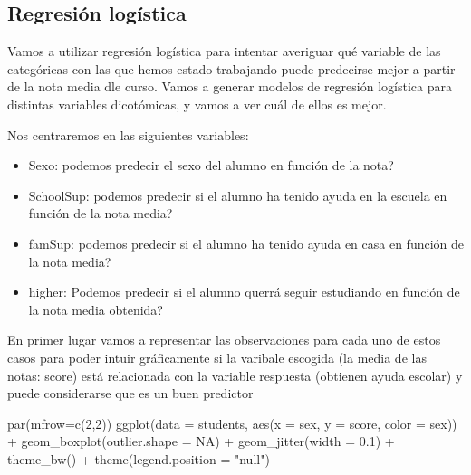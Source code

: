 \documentclass[]{article}
\newenvironment{Shaded}{\begin{snugshade}}{\end{snugshade}}
\newcommand{\DataTypeTok}[1]{\textcolor[rgb]{0.87,0.87,0.75}{#1}}
\newcommand{\DecValTok}[1]{\textcolor[rgb]{0.86,0.86,0.80}{#1}}
\newcommand{\FloatTok}[1]{\textcolor[rgb]{0.75,0.75,0.82}{#1}}
\newcommand{\KeywordTok}[1]{\textcolor[rgb]{0.94,0.87,0.69}{#1}}
\newcommand{\NormalTok}[1]{\textcolor[rgb]{0.80,0.80,0.80}{#1}}
\newcommand{\OperatorTok}[1]{\textcolor[rgb]{0.94,0.94,0.82}{#1}}
\newcommand{\OtherTok}[1]{\textcolor[rgb]{0.94,0.94,0.56}{#1}}
\newcommand{\StringTok}[1]{\textcolor[rgb]{0.80,0.58,0.58}{#1}}
\providecommand{\tightlist}{%
  \setlength{\itemsep}{0pt}\setlength{\parskip}{0pt}}
\begin{document}
\hypertarget{regresion-logistica}{%
\subsection{Regresión logística}\label{regresion-logistica}}

Vamos a utilizar regresión logística para intentar averiguar qué
variable de las categóricas con las que hemos estado trabajando puede
predecirse mejor a partir de la nota media dle curso. Vamos a generar
modelos de regresión logística para distintas variables dicotómicas, y
vamos a ver cuál de ellos es mejor.

Nos centraremos en las siguientes variables:

\begin{itemize}
\tightlist
\item
  Sexo: podemos predecir el sexo del alumno en función de la nota?
\item
  SchoolSup: podemos predecir si el alumno ha tenido ayuda en la escuela
  en función de la nota media?
\item
  famSup: podemos predecir si el alumno ha tenido ayuda en casa en
  función de la nota media?
\item
  higher: Podemos predecir si el alumno querrá seguir estudiando en
  función de la nota media obtenida?
\end{itemize}

En primer lugar vamos a representar las observaciones para cada uno de
estos casos para poder intuir gráficamente si la varibale escogida (la
media de las notas: score) está relacionada con la variable respuesta
(obtienen ayuda escolar) y puede considerarse que es un buen predictor

\begin{Shaded}
\begin{Highlighting}[]
\KeywordTok{par}\NormalTok{(}\DataTypeTok{mfrow=}\KeywordTok{c}\NormalTok{(}\DecValTok{2}\NormalTok{,}\DecValTok{2}\NormalTok{))}
\KeywordTok{ggplot}\NormalTok{(}\DataTypeTok{data =}\NormalTok{ students, }\KeywordTok{aes}\NormalTok{(}\DataTypeTok{x =}\NormalTok{ sex, }\DataTypeTok{y =}\NormalTok{ score, }\DataTypeTok{color =}\NormalTok{ sex)) }\OperatorTok{+}
\StringTok{  }\KeywordTok{geom_boxplot}\NormalTok{(}\DataTypeTok{outlier.shape =} \OtherTok{NA}\NormalTok{) }\OperatorTok{+}
\StringTok{  }\KeywordTok{geom_jitter}\NormalTok{(}\DataTypeTok{width =} \FloatTok{0.1}\NormalTok{) }\OperatorTok{+}
\StringTok{  }\KeywordTok{theme_bw}\NormalTok{() }\OperatorTok{+}
\StringTok{  }\KeywordTok{theme}\NormalTok{(}\DataTypeTok{legend.position =} \StringTok{"null"}\NormalTok{)}
\end{Highlighting}
\end{Shaded}
\end{document}
